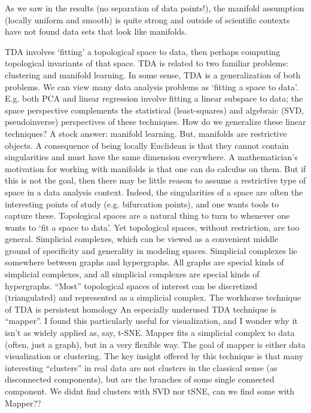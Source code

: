 \documentclass[12pt]{report}
\begin{document}
As we saw in the results (no separation of data points!), the manifold assumption (locally uniform and smooth) is quite strong and outside of scientific contexts have not found data sets that look like manifolds.

TDA involves ‘fitting’ a topological space to data, then perhaps computing topological invariants of that space. TDA is related to two familiar problems: clustering and manifold learning. In some sense, TDA is a generalization of both problems.
We can view many data analysis problems as ‘fitting a space to data’. E.g. both PCA and linear regression involve fitting a linear subspace to data; the space perspective complements the statistical (least-squares) and algebraic (SVD, pseudoinverse) perspectives of these techniques.
How do we generalize these linear techniques? A stock answer: manifold learning. But, manifolds are restrictive objects. A consequence of being locally Euclidean is that they cannot contain singularities and must have the same dimension everywhere. A mathematician’s motivation for working with manifolds is that one can do calculus on them. But if this is not the goal, then there may be little reason to assume a restrictive type of space in a data analysis context. Indeed, the singularities of a space are often the interesting points of study (e.g. bifurcation points), and one wants tools to capture these.
Topological spaces are a natural thing to turn to whenever one wants to ‘fit a space to data’. Yet topological spaces, without restriction, are too general. Simplicial complexes, which can be viewed as a convenient middle ground of specificity and generality in modeling spaces. Simplicial complexes lie somewhere between graphs and hypergraphs. All graphs are special kinds of simplicial complexes, and all simplicial complexes are special kinds of hypergraphs. “Most” topological spaces of interest can be discretized (triangulated) and represented as a simplicial complex.
The workhorse technique of TDA is persistent homology
An especially underused TDA technique is “mapper”. I found this particularly useful for visualization, and I wonder why it isn’t as widely applied as, say, t-SNE. Mapper fits a simplicial complex to data (often, just a graph), but in a very flexible way. The goal of mapper is either data visualization or clustering. The key insight offered by this technique is that many interesting “clusters” in real data are not clusters in the classical sense (as disconnected components), but are the branches of some single connected component. 
We didnt find clusters with SVD nor tSNE, can we find some with Mapper??
\end{document}
